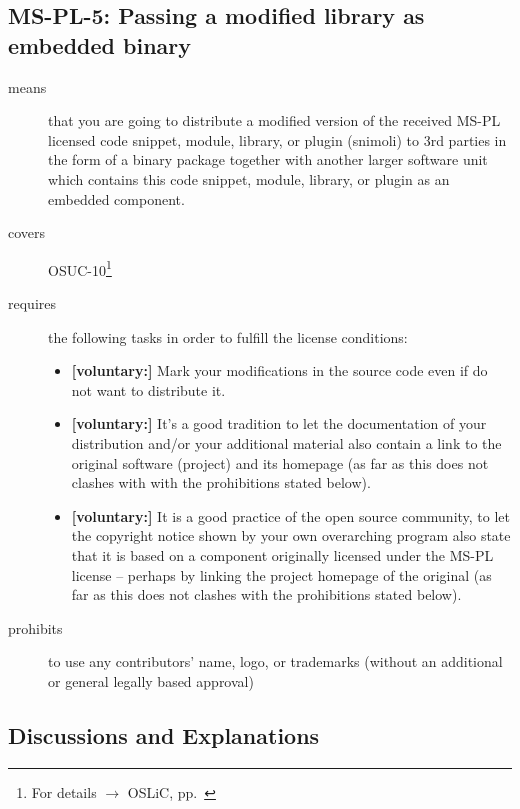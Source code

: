 \subsection{MS-PL-5: Passing a modified library as embedded binary}
\label{OSUC-10-MS-PL}
\begin{description}
\item[means] that you are going to distribute a modified version of the received
MS-PL licensed code snippet, module, library, or plugin (snimoli) to 3rd parties
in the form of a binary package together with another larger software unit which
contains this code snippet, module, library, or plugin as an embedded component.

\item[covers] OSUC-10\footnote{For details $\rightarrow$ OSLiC, pp.\ \pageref{OSUC-10-DEF}}
\item[requires] the following tasks in order to fulfill the license conditions:
\begin{itemize}
 
  \item \textbf{[voluntary:]} Mark your modifications in the source code even if
  do not want to distribute it.
  
  \item \textbf{[voluntary:]} It's a good tradition to let the documentation of
  your distribution and/or your additional material also contain a link to the
  original software (project) and its homepage (as far as this does not clashes
  with with the prohibitions stated below).
  
  \item \textbf{[voluntary:]} It is a good practice of the open source
  community, to let the copyright notice shown by your own overarching program
  also state that it is based on a component originally licensed under the MS-PL
  license -- perhaps by linking the project homepage of the original (as far as
  this does not clashes with the prohibitions stated below).
  
\end{itemize}

\item[prohibits] to use any contributors' name, logo, or trademarks (without an
additional or general legally based approval)

\end{description}

\subsection{Discussions and Explanations}


